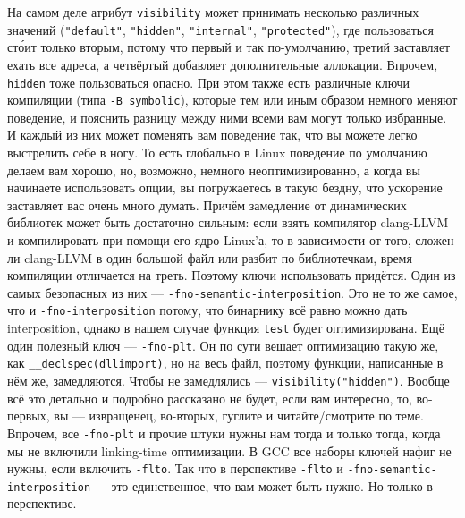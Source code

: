 \documentclass{article}
\begin{document}
    На самом деле атрибут \texttt{visibility} может принимать несколько различных значений (\texttt{"default"}, \texttt{"hidden"}, \texttt{"internal"}, \texttt{"protected"}), где пользоваться ст\'{о}ит только вторым, потому что первый и так по-умолчанию, третий заставляет ехать все адреса, а четвёртый добавляет дополнительные аллокации. Впрочем, \texttt{hidden} тоже пользоваться опасно. При этом также есть различные ключи компиляции (типа \texttt{-B symbolic}), которые тем или иным образом немного меняют поведение, и пояснить разницу между ними всеми вам могут только избранные. И каждый из них может поменять вам поведение так, что вы можете легко выстрелить себе в ногу. То есть глобально в Linux поведение по умолчанию делаем вам хорошо, но, возможно, немного неоптимизированно, а когда вы начинаете использовать опции, вы погружаетесь в такую бездну, что ускорение заставляет вас очень много думать. Причём замедление от динамических библиотек может быть достаточно сильным: если взять компилятор clang-LLVM и компилировать при помощи его ядро Linux'а, то в зависимости от того, сложен ли clang-LLVM в один большой файл или разбит по библиотечкам, время компиляции отличается на треть. Поэтому ключи использовать придётся. Один из самых безопасных из них --- \texttt{-fno-semantic-interposition}. Это не то же самое, что и \texttt{-fno-interposition} потому, что бинарнику всё равно можно дать interposition, однако в нашем случае функция \texttt{test} будет оптимизирована. Ещё один полезный ключ --- \texttt{-fno-plt}. Он по сути вешает оптимизацию такую же, как \texttt{__declspec(dllimport)}, но на весь файл, поэтому функции, написанные в нём же, замедляются. Чтобы не замедлялись --- \texttt{visibility("hidden")}. Вообще всё это детально и подробно рассказано не будет, если вам интересно, то, во-первых, вы --- извращенец, во-вторых, гуглите и читайте/смотрите по теме. Впрочем, все \texttt{-fno-plt} и прочие штуки нужны нам тогда и только тогда, когда мы не включили linking-time оптимизации. В GCC все наборы ключей нафиг не нужны, если включить \texttt{-flto}. Так что в перспективе \texttt{-flto} и \texttt{-fno-semantic-interposition} --- это единственное, что вам может быть нужно. Но только в перспективе.
\end{document}

